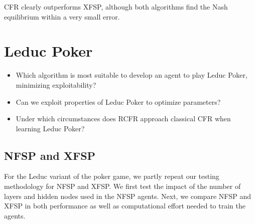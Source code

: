 \documentclass[10pt,a4paper]{article}
\begin{document}
CFR clearly outperforms XFSP, although both algorithms find the Nash equilibrium within a very small error.



\section{Leduc Poker}
\begin{tcolorbox}
\begin{itemize}
\item{Which algorithm is most suitable to develop an agent to play Leduc Poker, minimizing exploitability?}
\item{Can we exploit properties of Leduc Poker to optimize parameters?}
\item{Under which circumstances does RCFR approach classical CFR when learning Leduc Poker?}
\end{itemize}
\end{tcolorbox}
\subsection{NFSP and XFSP}
For the Leduc variant of the poker game, we partly repeat our testing methodology for NFSP and XFSP. We first test the impact of the number of layers and hidden nodes used in the NFSP agents. Next, we compare NFSP and XFSP in both performance as well as computational effort needed to train the agents.
 
\end{document}
